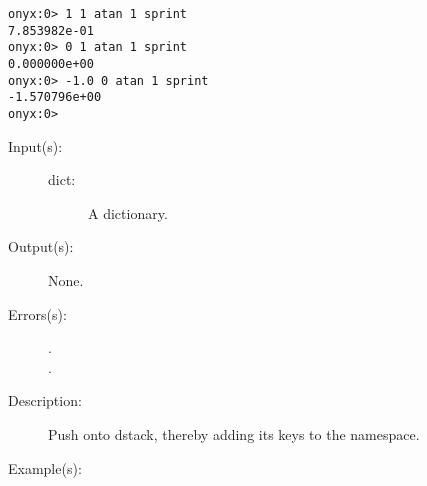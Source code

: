 \begin{description}
\begin{description}
\begin{verbatim}
onyx:0> 1 1 atan 1 sprint
7.853982e-01
onyx:0> 0 1 atan 1 sprint
0.000000e+00
onyx:0> -1.0 0 atan 1 sprint
-1.570796e+00
onyx:0>
		\end{verbatim}
	\end{description}
\label{systemdict:begin}
\item[{\onyxop{dict}{begin}{--}}: ]
	\begin{description}\item[]
	\item[Input(s): ]
		\begin{description}\item[]
		\item[dict: ]
			A dictionary.
		\end{description}
	\item[Output(s): ] None.
	\item[Errors(s): ]
		\begin{description}\item[]
		\item[.]
		\item[.]
		\end{description}
	\item[Description: ]
		Push  onto dstack, thereby adding its keys to the
		namespace.
	\item[Example(s): ]\begin{verbatim}


\end{verbatim}
\end{description}
\end{description}
